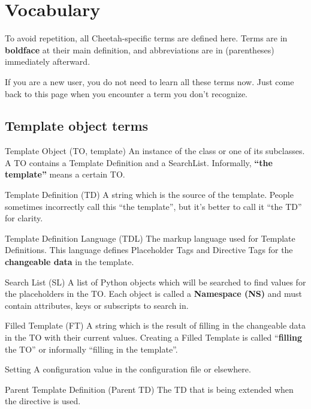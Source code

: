 \section{Vocabulary}
\label{vocabulary}

To avoid repetition, all Cheetah-specific terms are defined here.  Terms are in
{\bf boldface} at their main definition, and abbreviations are in (parentheses)
immediately afterward.  

If you are a new user, you do not need to learn all these terms now.
Just come back to this page when you encounter a term you don't recognize.

\subsection{Template object terms}

\begin{description}

\item{Template Object (TO, template)}  An instance of the class
      or one of its subclasses.  A 
     TO contains a Template Definition and a SearchList.  Informally, 
     {\bf ``the template''} means a certain TO.

\item{Template Definition (TD)}  A string which is the source of the template.
     People sometimes incorrectly call this ``the template'', but it's better
     to call it ``the TD'' for clarity.

\item{Template Definition Language (TDL)}  The markup language used for
     Template Definitions.  This language defines Placeholder Tags and
     Directive Tags for the {\bf changeable data} in the template.

\item{Search List (SL)}  A list of Python objects which will be searched to find
     values for the placeholders in the TO.  Each object is called a
     {\bf Namespace (NS)} and must contain attributes, keys or subscripts to
     search in.  

\item{Filled Template (FT)}  A string which is the result of filling in the
     changeable data in the TO with their current values.
     Creating a Filled Template is called ``{\bf filling} the TO'' or 
     informally ``filling in the template''.

\item{Setting}  A configuration value in the configuration file or elsewhere.

\item{Parent Template Definition (Parent TD)}  The TD that is being extended
     when the  directive is used.

\end{description}


